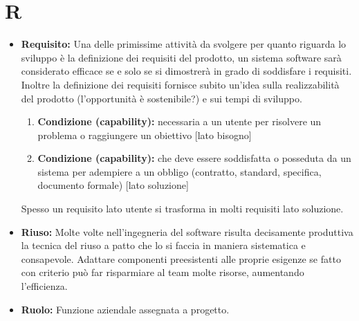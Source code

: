 \documentclass[a4paper]{report}
\newcommand{\mychapter}[2]{
	\setcounter{chapter}{#1}
	\setcounter{section}{0}
	\setcounter{subsection}{1}
	\chapter*{#2}
	\addcontentsline{toc}{chapter}{#2}
}
\begin{document}
	\mychapter{15}{R}
		\begin{itemize}
			\item \textbf{Requisito:}  Una delle primissime attività da svolgere per quanto riguarda lo sviluppo è la 
			definizione dei requisiti del prodotto, un sistema software sarà considerato efficace se e solo se si dimostrerà 
			in grado di soddisfare i requisiti. Inoltre la definizione dei requisiti fornisce subito un’idea sulla realizzabilità 
			del prodotto (l'opportunità è sostenibile?) e sui tempi di sviluppo.
			\begin{enumerate}
				\item \textbf{Condizione (capability):} necessaria a un utente per risolvere un problema o raggiungere un obiettivo [lato bisogno]
				\item \textbf{Condizione (capability):} che deve essere soddisfatta o posseduta da un sistema per adempiere a un obbligo (contratto, 
			  standard, specifica, documento formale) [lato soluzione]
			\end{enumerate}
			Spesso un requisito lato utente si trasforma in molti requisiti lato soluzione.
			\item \textbf{Riuso:} Molte volte nell'ingegneria del software risulta decisamente produttiva la tecnica del riuso a patto che lo si faccia 
			in maniera sistematica e consapevole. Adattare componenti preesistenti alle proprie esigenze se fatto con criterio può far 
			risparmiare al team molte risorse, aumentando l'efficienza.
			\item \textbf{Ruolo:} Funzione aziendale assegnata a progetto.
		\end{itemize}
		
\end{document}
